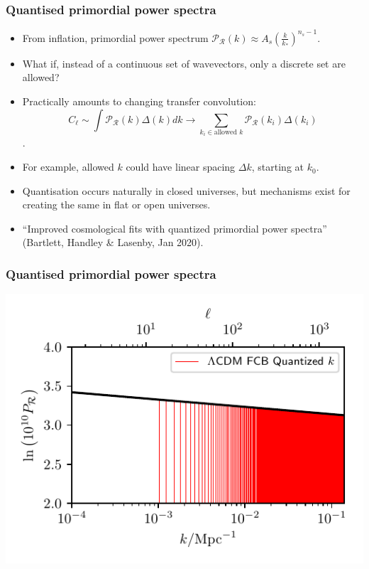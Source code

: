 \documentclass[%
]{beamer}
\begin{document}
\begin{frame}
    \frametitle{Quantised primordial power spectra}
    \begin{itemize}
        \item From inflation, primordial power spectrum $\mathcal{P}_\mathcal{R}(k)\approx A_s{\left( \frac{k}{k_*} \right)}^{n_s-1}$.
        \item What if, instead of a continuous set of wavevectors, only a discrete set are allowed?
        \item Practically amounts to changing transfer convolution: \[C_\ell \sim \int \mathcal{P}_\mathcal{R}(k) \Delta(k) dk \to \sum\limits_{k_i\in {\text{allowed } k}}\mathcal{P}_\mathcal{R}(k_i) \Delta(k_i)\].
        \item For example, allowed $k$ could have linear spacing $\Delta k$, starting at $k_0$.
        \item Quantisation occurs naturally in closed universes, but mechanisms exist for creating the same in flat or open universes.
        \item ``Improved cosmological fits with quantized primordial power spectra'' (Bartlett, Handley \& Lasenby, Jan 2020).
    \end{itemize}
\end{frame}

\begin{frame}
    \frametitle{Quantised primordial power spectra}
        \includegraphics[width=\textwidth]{Quantised_Primordial}
\end{frame}
\end{document}
